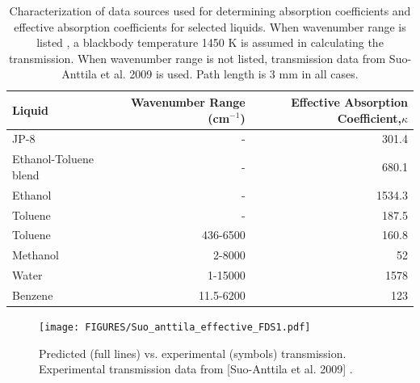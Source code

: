 \begin{table}[ht]
\caption{Characterization of data sources used for determining absorption coefficients and effective absorption coefficients for selected liquids. When wavenumber range is listed , a blackbody temperature 1450 K is assumed in calculating the transmission. When wavenumber range is not listed, transmission data from Suo-Anttila et al. 2009 \cite{Suo-Anttila:PCT2009} is used. Path length is 3 mm in all cases. }

\centering
\begin{tabular}{l r r}
\hline\hline
Liquid & Wavenumber Range (cm$^{-1}$) & Effective Absorption Coefficient,$\kappa$  \\ [0.5ex]
\hline
JP-8 \cite{Suo-Anttila:PCT2009}     &  -          & 301.4   \\
Ethanol-Toluene blend \cite{Suo-Anttila:PCT2009}                &  -          & 680.1   \\
Ethanol \cite{Suo-Anttila:PCT2009}   &  -          & 1534.3  \\
Toluene \cite{Suo-Anttila:PCT2009}   &  -          & 187.5   \\
Toluene \cite{Bertie:AS1994a}        &  436-6500   & 160.8   \\
Methanol\cite{Bertie:AS1993a}                           &  2-8000     & 52\footnotemark     \\
Water   \cite{Bertie:AS1996}                             &  1-15000  & 1578    \\
Benzene \cite{Bertie:AS1993b}                             &  11.5-6200  & 123     \\
\hline
\end{tabular}
\label{tbl_abscoeff}
\end{table}

\begin{figure}[ht]
    \centering
    \texttt{[image: FIGURES/Suo\_anttila\_effective\_FDS1.pdf]}
    \caption{Predicted (full lines) vs. experimental (symbols) transmission.  Experimental transmission data from [Suo-Anttila et al. 2009] \cite{Suo-Anttila:PCT2009}.}
    \label{fig_trans2}
\end{figure}

